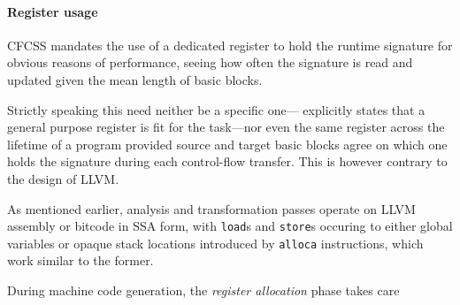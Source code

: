 \paragraph{Register usage}

CFCSS mandates the use of a dedicated register to hold the runtime signature
for obvious reasons of performance, seeing how often the signature is read and
updated given the mean length of basic blocks.

Strictly speaking this need neither be a specific one—\cite{oh-2002-control}
explicitly states that a general purpose register is fit for the task—nor even
the same register across the lifetime of a program provided source and target
basic blocks agree on which one holds the signature during each control-flow
transfer. This is however contrary to the design of LLVM.

As mentioned earlier, analysis and transformation passes operate on LLVM
assembly or bitcode in SSA form, with \texttt{load}s and \texttt{store}s
occuring to either global variables or opaque stack locations introduced by \texttt{alloca} instructions,
which work similar to the former.

During machine code generation, the \emph{register allocation} phase takes care

